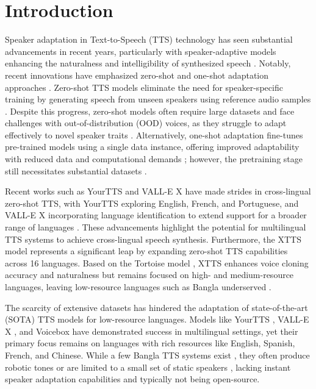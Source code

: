\section{Introduction}
\label{sec:introduction}

Speaker adaptation in Text-to-Speech (TTS) technology has seen substantial advancements in recent years, particularly with speaker-adaptive models enhancing the naturalness and intelligibility of synthesized speech \cite{eren2023deep}. Notably, recent innovations have emphasized zero-shot and one-shot adaptation approaches \cite{kodirov2015unsupervised}. Zero-shot TTS models eliminate the need for speaker-specific training by generating speech from unseen speakers using reference audio samples \cite{min2021meta}. Despite this progress, zero-shot models often require large datasets and face challenges with out-of-distribution (OOD) voices, as they struggle to adapt effectively to novel speaker traits \cite{le2023voicebox, ju2024naturalspeech3}. Alternatively, one-shot adaptation fine-tunes pre-trained models using a single data instance, offering improved adaptability with reduced data and computational demands \cite{yan2021adaspeech2, wang2023neural}; however, the pretraining stage still necessitates substantial datasets \cite{zhang2021transfer}.

Recent works such as YourTTS \cite{bai2022yourtts} and VALL-E X \cite{xu2022vall} have made strides in cross-lingual zero-shot TTS, with YourTTS exploring English, French, and Portuguese, and VALL-E X incorporating language identification to extend support for a broader range of languages \cite{xu2022vall}. These advancements highlight the potential for multilingual TTS systems to achieve cross-lingual speech synthesis. Furthermore, the XTTS model \cite{casanova2024xtts} represents a significant leap by expanding zero-shot TTS capabilities across 16 languages. Based on the Tortoise model \cite{casanova2024xtts}, XTTS enhances voice cloning accuracy and naturalness but remains focused on high- and medium-resource languages, leaving low-resource languages such as Bangla underserved \cite{zhang2022universal, xu2023cross}. 

The scarcity of extensive datasets has hindered the adaptation of state-of-the-art (SOTA) TTS models for low-resource languages. Models like YourTTS \cite{bai2022yourtts}, VALL-E X \cite{baevski2022vall}, and Voicebox \cite{baevski2022voicebox} have demonstrated success in multilingual settings, yet their primary focus remains on languages with rich resources like English, Spanish, French, and Chinese. While a few Bangla TTS systems exist \cite{gutkin2016tts}, they often produce robotic tones \cite{hossain2018development} or are limited to a small set of static speakers \cite{gong2024initial}, lacking instant speaker adaptation capabilities and typically not being open-source.

